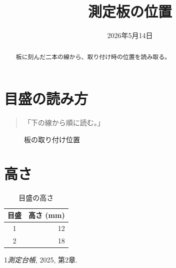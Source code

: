 \documentclass{ltjsarticle}
\begin{document}
\title{測定板の位置}\author{}\date{2026年5月14日}\maketitle
\begin{abstract}板に刻んだ二本の線から、取り付け時の位置を読み取る。\end{abstract}
\tableofcontents
\section{目盛の読み方}\begin{quote}「下の線から順に読む。」\end{quote}
\begin{figure}[ht]\centering\fbox{\rule{0pt}{8mm}\rule{33mm}{0pt}}\caption{板の取り付け位置}\end{figure}
\section{高さ}
\begin{table}[ht]\centering\begin{tabular}{cr}目盛&高さ (mm)\\\hline 1&12\\2&18\end{tabular}\caption{目盛の高さ}\end{table}
\begin{thebibliography}{1}\emph{測定台帳}, 2025, 第2章.\end{thebibliography}
\end{document}
